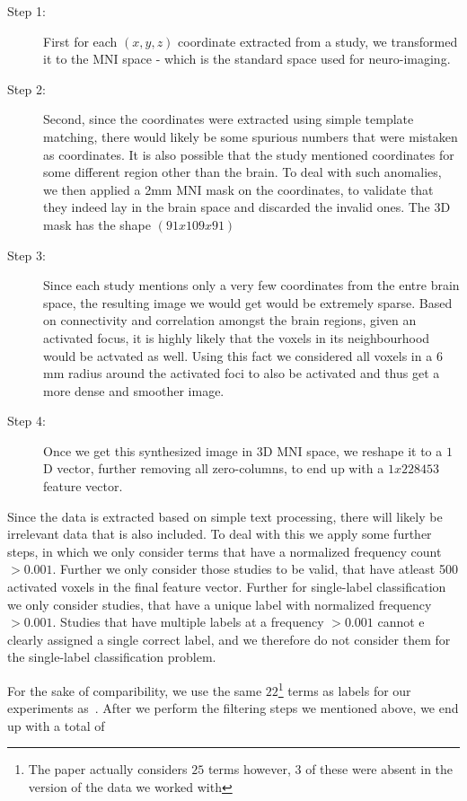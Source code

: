 \documentclass{article} %
\begin{document}
\begin{description}
\item[Step 1: ] First for each $(x, y, z)$ coordinate extracted from a study, we transformed it to the MNI space - which is the standard space used for neuro-imaging. 
\item[Step 2: ] Second, since the coordinates were extracted using simple template matching, there would likely be some spurious numbers that were mistaken as coordinates. It is also possible that the study mentioned coordinates for some different region other than the brain. To deal with such anomalies, we then applied a 2mm MNI mask on the coordinates, to validate that they indeed lay in the brain space and discarded the invalid ones. The 3D mask has the shape $(91 x 109 x 91)$ 
\item[Step 3: ] Since each study mentions only a very few coordinates from the entre brain space, the resulting image we would get would be extremely sparse. Based on connectivity and correlation amongst the brain regions, given an activated focus, it is highly likely that the voxels in its neighbourhood would be actvated as well. Using this fact we considered all voxels in a $6$ mm radius around the activated foci to also be activated and thus get a more dense and smoother image.
\item[Step 4: ] Once we get this synthesized image in $3$D MNI space, we reshape it to a $1$D vector, further removing all zero-columns, to end up with a $1 x 228453$ feature vector.  
\end{description}

Since the data is extracted based on simple text processing, there will likely be irrelevant data that is also included. To deal with this we apply some further steps, in which we only consider terms that have a normalized frequency count $ > 0.001$. Further we only consider those studies to be valid, that have atleast 500 activated voxels in the final feature vector. Further for single-label classification we only consider studies, that have a unique label with normalized frequency  $ > 0.001$. Studies that have multiple labels at a frequency $ > 0.001$ cannot e clearly assigned a single correct label, and we therefore do not consider them for the single-label classification problem.

For the sake of comparibility, we use the same $22$\footnote{The paper actually considers $25$ terms however, $3$ of these were absent in the version of the data we worked with} terms as labels for our experiments as~\cite{yarkoni2011large}. After we perform the filtering steps we mentioned above, we end up with a total of 
\end{document}
